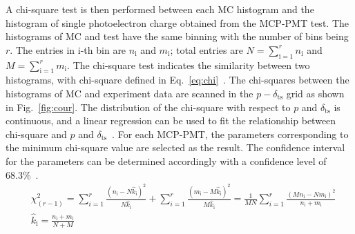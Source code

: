 A chi-square test is then performed between each
MC histogram and the histogram of single photoelectron charge obtained from the MCP-PMT test.
The histograms of MC and test have the same binning with the number of bins being $r$.
The entries in i-th bin are $n_{\mathrm{i}}$ and $m_{\mathrm{i}}$; total entries are
$N = \sum_{{\mathrm{i}}=1}^{r}n_{\mathrm{i}}$ and $M = \sum_{{\mathrm{i}}=1}^{r}m_{\mathrm{i}}$.
The chi-square test indicates the similarity between two histograms, with chi-square defined in Eq.~\eqref{eq:chi}~\cite{2006Comparison}.
The chi-squares between the histograms of MC and experiment data are scanned in the $p-\delta_{\mathrm{ts}}$ grid as shown in Fig.~\ref{fig:cour}.
The distribution of the chi-square
with respect to $p$ and $\delta_{\mathrm{ts}}$ is continuous,
and a linear regression can be used to fit the relationship
between chi-square and $p$ and $\delta_{\mathrm{ts}}$~\cite{oh2013introduction}.
For each MCP-PMT, the parameters corresponding to the minimum chi-square value are selected as the result.
The confidence interval for the parameters can be determined accordingly
with a confidence level of 68.3\%~\cite{cowan1997statistical}.
\begin{equation}
    \label{eq:chi}
    \begin{aligned}
         & \chi^2_{(r-1)}=\sum_{i=1}^r \frac{\left(n_{\mathrm{i}}-N \hat{k}_{\mathrm{i}}\right)^2}{N \hat{k}_{\mathrm{i}}}+\sum_{i=1}^r
        \frac{\left(m_{\mathrm{i}}-M \hat{k}_{\mathrm{i}}\right)^2}{M \hat{k}_{\mathrm{i}}}=\frac{1}{M N} \sum_{i=1}^r
        \frac{\left(M n_{\mathrm{i}}-N m_{\mathrm{i}}\right)^2}{n_{\mathrm{i}}+m_{\mathrm{i}}}                                          \\
         & \hat{k}_{\mathrm{i}}=\frac{n_{\mathrm{i}}+m_{\mathrm{i}}}{N+M}
    \end{aligned}
\end{equation}

